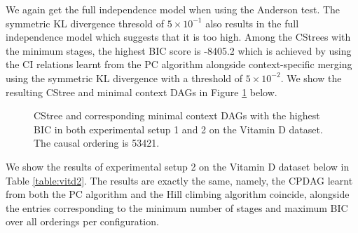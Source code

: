 \documentclass{tufte-book}
\begin{document}
We again get the full independence model when using the Anderson test. The symmetric KL divergence thresold of \(5\times 10^{-1}\) also results in the full independence model which suggests that it is too high. Among the CStrees with the minimum stages, the highest BIC score is -8405.2 which is achieved by using the CI relations learnt from the PC algorithm alongside context-specific merging using the symmetric KL divergence with a threshold of \(5 \times 10^{-2}\). We show the resulting CStree and minimal context DAGs in Figure \ref{fig:vitdmaxbic} below.

\begin{figure}[]\label{fig:vitdmaxbic}
   \begin{floatrow}
%
\caption{CStree and corresponding minimal context DAGs with the highest BIC in both experimental setup 1 and 2 on the Vitamin D dataset. The causal ordering is 53421. }
        
   \end{floatrow}
\end{figure}

We show the results of experimental setup 2 on the Vitamin D dataset below in Table \ref{table:vitd2}. The results are exactly the same, namely, the CPDAG learnt from both the PC algorithm and the Hill climbing algorithm coincide, alongside the entries corresponding to the minimum number of stages and maximum BIC over all orderings per configuration.
\end{document}
